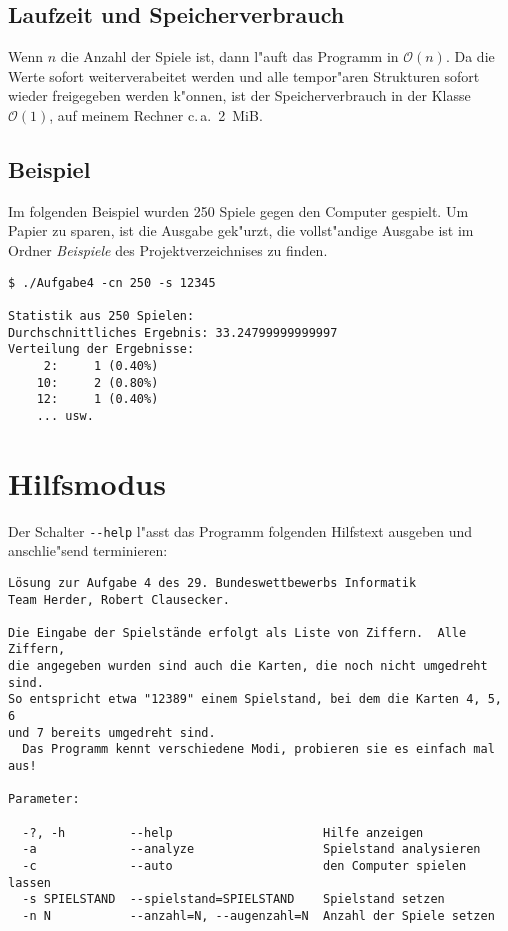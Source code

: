 \documentclass{scrreprt}
\begin{document}
\subsection*{Laufzeit und Speicherverbrauch}
Wenn $n$ die Anzahl der Spiele ist, dann l"auft das Programm in
$\mathcal{O}(n)$. Da die Werte sofort weiterverabeitet werden und alle
tempor"aren Strukturen sofort wieder freigegeben werden k"onnen, ist der
Speicherverbrauch in der Klasse $\mathcal{O}(1)$, auf meinem Rechner
c.\,a.~2~MiB.

\subsection*{Beispiel}
Im folgenden Beispiel wurden 250 Spiele gegen den Computer gespielt.  Um Papier
zu sparen, ist die Ausgabe gek"urzt, die vollst"andige Ausgabe ist im Ordner
\emph{Beispiele} des Projektverzeichnises zu finden.

\begin{verbatim}
$ ./Aufgabe4 -cn 250 -s 12345

Statistik aus 250 Spielen:
Durchschnittliches Ergebnis: 33.24799999999997
Verteilung der Ergebnisse:
	 2:     1 (0.40%)
	10:     2 (0.80%)
	12:     1 (0.40%)
    ... usw.
\end{verbatim}

\section{Hilfsmodus}
Der Schalter \texttt{-\/-help} l"asst das Programm folgenden Hilfstext ausgeben
und anschlie"send terminieren:

\begin{verbatim}
Lösung zur Aufgabe 4 des 29. Bundeswettbewerbs Informatik
Team Herder, Robert Clausecker.

Die Eingabe der Spielstände erfolgt als Liste von Ziffern.  Alle Ziffern,
die angegeben wurden sind auch die Karten, die noch nicht umgedreht sind.
So entspricht etwa "12389" einem Spielstand, bei dem die Karten 4, 5, 6
und 7 bereits umgedreht sind.
  Das Programm kennt verschiedene Modi, probieren sie es einfach mal aus!

Parameter:

  -?, -h         --help                     Hilfe anzeigen
  -a             --analyze                  Spielstand analysieren
  -c             --auto                     den Computer spielen lassen
  -s SPIELSTAND  --spielstand=SPIELSTAND    Spielstand setzen
  -n N           --anzahl=N, --augenzahl=N  Anzahl der Spiele setzen

\end{verbatim}
\end{document}

